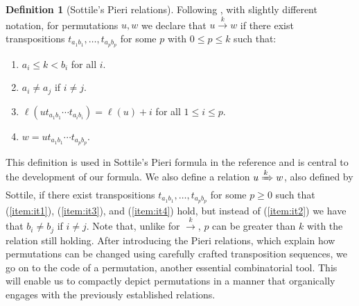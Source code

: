 \documentclass{amsart}
\theoremstyle{definition}
\newtheorem{definition}[lemma]{Definition}
\theoremstyle{remark}
\numberwithin{equation}{subsection}
\newcommand{\tom}[1]{\xrightarrow{#1}}
\newcommand{\Tom}[1]{\xRightarrow{#1}}
\begin{document}
	\begin{definition}[Sottile's Pieri relations] \label{definition:pierisymb}
		Following \cite{sottile}, with slightly different notation, for permutations $u,w$ we declare that $u\tom{k} w$ if there exist transpositions $t_{a_1b_1},\ldots, t_{a_pb_p}$ for some $p$ with $0\leq p\leq k$ such that:
		\begin{enumerate}
			\item \label{item:it1} $a_i\leq k<b_i$ for all $i$.
			\item \label{item:it2} $a_i\neq a_j$ if $i\neq j$.
			\item \label{item:it3} $\ell(ut_{a_1b_1}\cdots t_{a_ib_i})=\ell(u)+i$ for all $1\leq i\leq p$.
			\item \label{item:it4} $w=ut_{a_1b_1}\cdots t_{a_pb_p}$.
		\end{enumerate}
		This definition is used in Sottile's Pieri formula in the reference and is central to the development of our formula. We also define a relation $u\Tom{k} w$, also defined by Sottile, if there exist transpositions $t_{a_1b_1},\ldots,t_{a_pb_p}$ for some $p\geq 0$ such that (\ref{item:it1}), (\ref{item:it3}), and (\ref{item:it4}) hold, but instead of (\ref{item:it2}) we have that $b_i\neq b_j$ if $i\neq j$. Note that, unlike for $\tom{k}$, $p$ can be greater than $k$ with the relation still holding.
        After introducing the Pieri relations, which explain how permutations can be changed using carefully crafted transposition sequences, we go on to the code of a permutation, another essential combinatorial tool.  This will enable us to compactly depict permutations in a manner that organically engages with the previously established relations.

	\end{definition}
	
	
	
\end{document}
